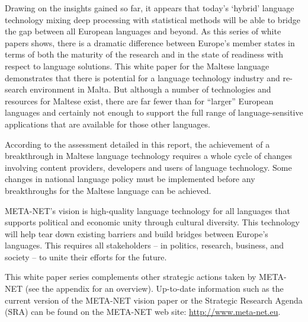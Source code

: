 \begin{multicols}{2}

Drawing on the insights gained so far, it appears that today’s `hybrid' language technology mixing deep processing with statistical methods will be able to bridge the gap between all European languages and beyond. As this series of white papers shows, there is a dramatic difference between Europe’s member states in terms of both the maturity of the research and in the state of readiness with respect to language solutions. This white paper for the Maltese language demonstrates that there is potential for a language technology industry and re-search environment in Malta. But although a number of technologies and resources for Maltese exist, there are far fewer than for “larger” European languages and certainly not enough to support the full range of language-sensitive applications that are available for those other languages.

According to the assessment detailed in this report, the achievement of a breakthrough in Maltese language technology requires a whole cycle of changes involving content providers, developers and users of language technology. Some changes in national language policy must be implemented before any breakthroughs for the Maltese language can be achieved.

META-NET’s vision is high-quality language technology for all languages that supports political and economic unity through cultural diversity. This technology will help tear down existing barriers and build bridges between Europe’s languages. This requires all stakeholders -- in politics, research, business, and society -- to unite their efforts for the future.

This white paper series complements other strategic actions taken by META-NET (see the appendix for an overview). Up-to-date information such as the current version of the META-NET vision paper \cite{Meta1}  or the Strategic Research Agenda (SRA) can be found on the META-NET web site: \url{http://www.meta-net.eu}.

\end{multicols}

\clearpage


